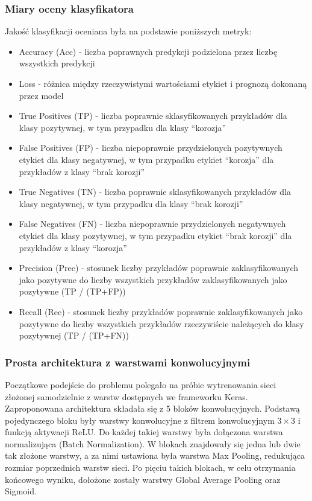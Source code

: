 \documentclass[polish,12pt]{aghthesis}
\begin{document}
\subsubsection{Miary oceny klasyfikatora}
\par\noindent Jakość klasyfikacji oceniana była na podstawie poniższych metryk:
\begin{itemize}
    \item Accuracy (Acc) - liczba poprawnych predykcji podzielona przez liczbę wszystkich predykcji
    \item Loss - różnica między rzeczywistymi wartościami etykiet i prognozą dokonaną przez model
    \item True Positives (TP) - liczba poprawnie sklasyfikowanych przykładów dla klasy pozytywnej, w tym przypadku dla klasy ``korozja''
    \item False Positives (FP) - liczba niepoprawnie przydzielonych pozytywnych etykiet dla klasy negatywnej, w tym przypadku etykiet  ``korozja'' dla przykładów z klasy ``brak korozji''
    \item True Negatives (TN) - liczba poprawnie sklasyfikowanych przykładów dla klasy negatywnej, w tym przypadku dla klasy ``brak korozji''
    \item False Negatives (FN) - liczba niepoprawnie przydzielonych negatywnych etykiet dla klasy pozytywnej, w tym przypadku etykiet ``brak korozji'' dla przykładów z klasy ``korozja''
    \item Precision (Prec) - stosunek liczby przykładów poprawnie zaklasyfikowanych jako pozytywne do liczby wszystkich przykładów zaklasyfikowanych jako pozytywne (TP / (TP+FP))
    \item Recall (Rec) - stosunek liczby przykładów poprawnie zaklasyfikowanych jako pozytywne do liczby wszystkich przykładów rzeczywiście należących do klasy pozytywnej (TP / (TP+FN))
\end{itemize}

\subsubsection{Prosta architektura z warstwami konwolucyjnymi}

\par\noindent Początkowe podejście do problemu polegało na próbie wytrenowania sieci złożonej samodzielnie z warstw dostępnych we frameworku Keras. Zaproponowana architektura składała się z 5 bloków konwolucyjnych. Podstawą pojedynczego bloku były warstwy konwolucyjne z filtrem konwolucyjnym $3\times3$ i funkcją aktywacji ReLU. Do każdej takiej warstwy była dołączona warstwa normalizująca (Batch Normalization). W blokach znajdowały się jedna lub dwie tak złożone warstwy, a za nimi ustawiona była warstwa Max Pooling, redukująca rozmiar poprzednich warstw sieci. Po pięciu takich blokach, w celu otrzymania końcowego wyniku, dołożone zostały warstwy Global Average Pooling oraz Sigmoid.
\end{document}
